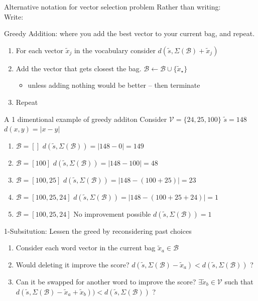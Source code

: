 \documentclass[]{beamer}
\newcommand{\s}{\tilde{s}}
\newcommand{\x}{\tilde{x}}
\newcommand{\V}{\mathcal{V}}
\renewcommand{\B}{\mathcal{B}}
\begin{document}
\begin{frame}{Alternative notation for vector selection problem}
	Rather than writing:\\
		\vectorselectionproblemdefn
	\vfill
	Write:\\
		\vectorselectionproblemdefnalt
	\vfill
	
\end{frame}


\begin{frame}{Greedy Addition: where you add the best vector to your current bag, and repeat.}
	\vectorselectionproblemdefnalt
	\vfill
	\begin{enumerate}
		\item For each vector $\x_j$ in the vocabulary consider  $d(\s, \Sigma(\B)+\x_j)$
		\item Add the vector that gets closest the bag. $\B\leftarrow\B\cup\{\x_\star\}$
			\begin{itemize}
				\item unless adding nothing would be better -- then terminate
			\end{itemize}
		\item Repeat
	\end{enumerate}
	\vfill
\end{frame}

\begin{frame}{A 1 dimentional example of greedy additon}
	\vectorselectionproblemdefnalt
	\vfill
	Consider $\V=\{24,25,100\}$ \hfill $\s=148$ \hfill $d(x,y)=|x-y|$
	\begin{enumerate}
		\item<1-> $\B=[]$ \hfill $d(\s,\Sigma(\B))=|148-0|=149$ 
		\item<2-> $\B=[100]$ \hfill $d(\s,\Sigma(\B))=|148-100|=48$ 
		\item<3-> $\B=[100,25]$ \hfill $d(\s,\Sigma(\B))=|148-(100+25)|=23$ 
		\item<4-> $\B=[100,25,24]$ \hfill $d(\s,\Sigma(\B))=|148-(100+25+24)|=1$ 
		\item<5-> $\B=[100,25,24]$ \hfill No improvement possible \hfill $d(\s,\Sigma(\B))=1$ 
	\end{enumerate}
	\vfill
	\vfill
\end{frame}

\begin{frame}{1-Subsitution: Lessen the greed by reconsidering past choices}
	\vectorselectionproblemdefnalt
	\vfill
	\begin{enumerate}
		\item Consider each word vector in the current bag $\x_a\in\B$
		\item Would deleting it improve the score? $d(\s,\Sigma(\B)-\x_a)<d(\s,\Sigma(\B))$ ?
		\item Can it be swapped for another word to improve the score?
		$\exists \x_b\in\V$ such that
		$d(\s,\Sigma(\B)-\x_a+\x_b))<d(\s,\Sigma(\B))$ ?
	\end{enumerate}
\end{frame}
\end{document}
